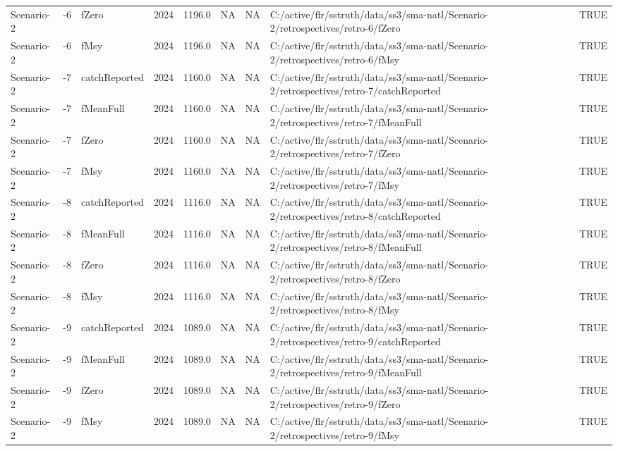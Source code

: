 \begin{table}
\begin{tabular}[t]{lllrrrrll}
Scenario-2 & -6 & fZero & 2024 & 1196.0 & NA & NA & C:/active/flr/sstruth/data/ss3/sma-natl/Scenario-2/retrospectives/retro-6/fZero & TRUE\\
Scenario-2 & -6 & fMsy & 2024 & 1196.0 & NA & NA & C:/active/flr/sstruth/data/ss3/sma-natl/Scenario-2/retrospectives/retro-6/fMsy & TRUE\\
Scenario-2 & -7 & catchReported & 2024 & 1160.0 & NA & NA & C:/active/flr/sstruth/data/ss3/sma-natl/Scenario-2/retrospectives/retro-7/catchReported & TRUE\\
Scenario-2 & -7 & fMeanFull & 2024 & 1160.0 & NA & NA & C:/active/flr/sstruth/data/ss3/sma-natl/Scenario-2/retrospectives/retro-7/fMeanFull & TRUE\\
\addlinespace
Scenario-2 & -7 & fZero & 2024 & 1160.0 & NA & NA & C:/active/flr/sstruth/data/ss3/sma-natl/Scenario-2/retrospectives/retro-7/fZero & TRUE\\
Scenario-2 & -7 & fMsy & 2024 & 1160.0 & NA & NA & C:/active/flr/sstruth/data/ss3/sma-natl/Scenario-2/retrospectives/retro-7/fMsy & TRUE\\
Scenario-2 & -8 & catchReported & 2024 & 1116.0 & NA & NA & C:/active/flr/sstruth/data/ss3/sma-natl/Scenario-2/retrospectives/retro-8/catchReported & TRUE\\
Scenario-2 & -8 & fMeanFull & 2024 & 1116.0 & NA & NA & C:/active/flr/sstruth/data/ss3/sma-natl/Scenario-2/retrospectives/retro-8/fMeanFull & TRUE\\
Scenario-2 & -8 & fZero & 2024 & 1116.0 & NA & NA & C:/active/flr/sstruth/data/ss3/sma-natl/Scenario-2/retrospectives/retro-8/fZero & TRUE\\
\addlinespace
Scenario-2 & -8 & fMsy & 2024 & 1116.0 & NA & NA & C:/active/flr/sstruth/data/ss3/sma-natl/Scenario-2/retrospectives/retro-8/fMsy & TRUE\\
Scenario-2 & -9 & catchReported & 2024 & 1089.0 & NA & NA & C:/active/flr/sstruth/data/ss3/sma-natl/Scenario-2/retrospectives/retro-9/catchReported & TRUE\\
Scenario-2 & -9 & fMeanFull & 2024 & 1089.0 & NA & NA & C:/active/flr/sstruth/data/ss3/sma-natl/Scenario-2/retrospectives/retro-9/fMeanFull & TRUE\\
Scenario-2 & -9 & fZero & 2024 & 1089.0 & NA & NA & C:/active/flr/sstruth/data/ss3/sma-natl/Scenario-2/retrospectives/retro-9/fZero & TRUE\\
Scenario-2 & -9 & fMsy & 2024 & 1089.0 & NA & NA & C:/active/flr/sstruth/data/ss3/sma-natl/Scenario-2/retrospectives/retro-9/fMsy & TRUE\\

\end{tabular}
\end{table}
